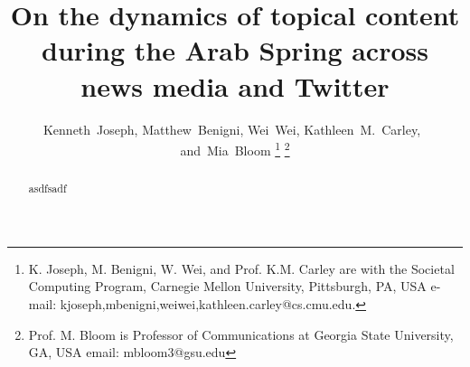 \documentclass[journal]{IEEEtran}
\title{On the dynamics of topical content during the Arab Spring across news media and Twitter}
\author{Kenneth~Joseph, Matthew~Benigni, Wei~Wei, 
        Kathleen~M.~Carley,~\IEEEmembership{Fellow,~IEEE,}
        and~Mia~Bloom%
\thanks{K. Joseph, M. Benigni, W. Wei, and Prof. K.M. Carley are with the Societal Computing Program, Carnegie Mellon University,
Pittsburgh, PA, USA e-mail: kjoseph,mbenigni,weiwei,kathleen.carley@cs.cmu.edu.}%
\thanks{Prof. M. Bloom is Professor of Communications at Georgia State University, GA, USA email: mbloom3@gsu.edu}%
}
\begin{document}
\maketitle
\begin{abstract}
asdfsadf
\end{abstract}

\IEEEpeerreviewmaketitle








	





\end{document}
